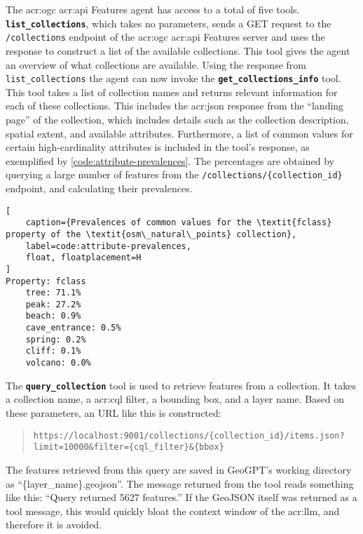 The \acrshort{acr:ogc} \acrshort{acr:api} Features agent has access to a total of five tools. \textbf{\texttt{list\_collections}}, which takes no parameters, sends a GET request to the \texttt{/collections} endpoint of the \acrshort{acr:ogc} \acrshort{acr:api} Features server and uses the response to construct a list of the available collections. This tool gives the agent an overview of what collections are available. Using the response from \texttt{list\_collections} the agent can now invoke the \textbf{\texttt{get\_collections\_info}} tool. This tool takes a list of collection names and returns relevant information for each of these collections. This includes the \acrshort{acr:json} response from the \enquote{landing page} of the collection, which includes details such as the collection description, spatial extent, and available attributes. Furthermore, a list of common values for certain high-cardinality attributes is included in the tool's response, as exemplified by \autoref{code:attribute-prevalences}. The percentages are obtained by querying a large number of features from the \texttt{/collections/\{collection\_id\}} endpoint, and calculating their prevalences.

\begin{lstlisting}[
    caption={Prevalences of common values for the \textit{fclass} property of the \textit{osm\_natural\_points} collection},
    label=code:attribute-prevalences,
    float, floatplacement=H
]
Property: fclass
    tree: 71.1%
    peak: 27.2%
    beach: 0.9%
    cave_entrance: 0.5%
    spring: 0.2%
    cliff: 0.1%
    volcano: 0.0%
\end{lstlisting}

The \textbf{\texttt{query\_collection}} tool is used to retrieve features from a collection. It takes a collection name, a \acrshort{acr:cql} filter, a bounding box, and a layer name. Based on these parameters, an URL like this is constructed:

\begin{quote}
    \texttt{https://localhost:9001/collections/\{collection\_id\}/items.json?limit=10000\&filter=\{cql\_filter\}\&\{bbox\}}
\end{quote}

The features retrieved from this query are saved in GeoGPT's working directory as \enquote{\{layer\_name\}.geojson}. The message returned from the tool reads something like this: \enquote{Query returned 5627 features.} If the GeoJSON itself was returned as a tool message, this would quickly bloat the context window of the \acrshort{acr:llm}, and therefore it is avoided.

